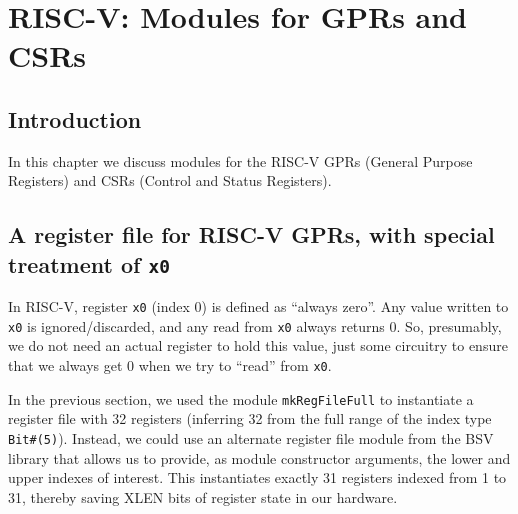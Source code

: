 

\chapter{RISC-V: Modules for GPRs and CSRs}


\setcounter{page}{1}
\renewcommand{\thepage}{\arabic{chapter}-\arabic{page}}

\label{ch_GPRs_and_CSRs}


\section{Introduction}

In this chapter we discuss modules for the RISC-V GPRs (General
Purpose Registers) and CSRs (Control and Status Registers).


\section{A register file for RISC-V GPRs, with special treatment of {\tt x0}}

\label{Sec_RISCV_regfile}


In RISC-V, register \verb|x0| (index 0) is defined as ``always zero''.
Any value written to \verb|x0| is ignored/discarded, and any read from
\verb|x0| always returns 0.  So, presumably, we do not need an actual
register to hold this value, just some circuitry to ensure that we
always get 0 when we try to ``read'' from \verb|x0|.

In the previous section, we used the module \verb|mkRegFileFull| to
instantiate a register file with 32 registers (inferring 32 from the
full range of the index type \verb|Bit#(5)|).  Instead, we could use
an alternate register file module from the BSV library that allows us
to provide, as module constructor arguments, the lower and upper
indexes of interest.  This instantiates exactly 31 registers indexed
from 1 to 31, thereby saving XLEN bits of register state in our
hardware.

